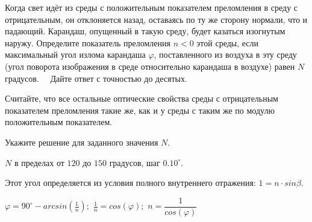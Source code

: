 Когда свет идёт из среды с положительным показателем преломления в
среду с отрицательным, он отклоняется назад, оставаясь по ту же сторону
нормали, что и падающий. Карандаш, опущенный в такую среду, будет казаться
изогнутым наружу. Определите  показатель преломления $n < 0$
этой среды, если максимальный угол излома карандаша $\varphi$,
поставленного из воздуха в эту среду (угол 
поворота изображения в среде относительно карандаша в воздухе) равен $N$ градусов.   Дайте ответ с точностью до десятых. 

Считайте, что все остальные оптические свойства среды с отрицательным показателем преломления такие же, как и у среды с таким же по модулю положительным показателем.

Укажите решение для заданного значения $N$.

\paramSection

$N$ в пределах от $120$ до $150$ градусов, шаг $0.10^{\circ}$.

\soultionSection

Этот угол определяется из условия полного внутреннего отражения: $1=n \cdot sin\beta$.


$\varphi =90^{\circ}-arcsin(\frac{1}{n});$   $\frac{1}{n}=cos(\varphi );$   $n=\dfrac{1}{cos(\varphi )}$ 

